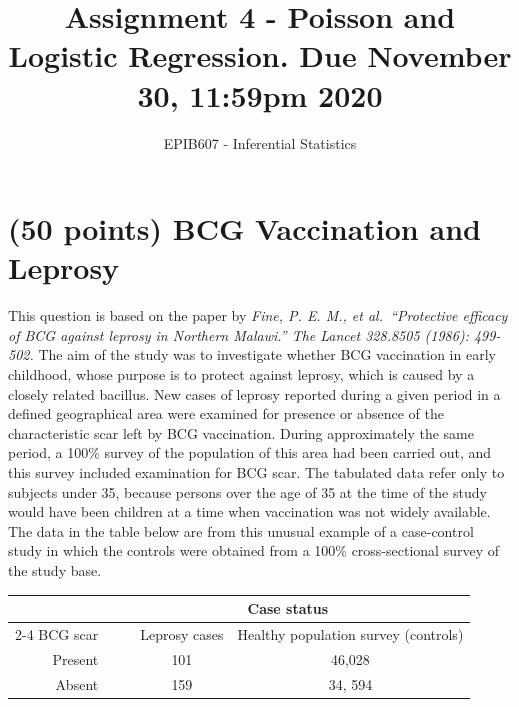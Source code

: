 \documentclass[letterpaper,12pt,twoside,]{pinp}
\title{Assignment 4 - Poisson and Logistic Regression. Due November 30, 11:59pm
2020}
\author[a]{EPIB607 - Inferential Statistics}
\affil[a]{Fall 2020, McGill University}
\begin{document}
\verticaladjustment{-2pt}

\maketitle
\thispagestyle{firststyle}



\hypertarget{points-bcg-vaccination-and-leprosy}{%
\section{(50 points) BCG Vaccination and
Leprosy}\label{points-bcg-vaccination-and-leprosy}}

This question is based on the paper by \emph{Fine, P. E. M., et
al.~``Protective efficacy of BCG against leprosy in Northern Malawi.''
The Lancet 328.8505 (1986): 499-502.} The aim of the study was to
investigate whether BCG vaccination in early childhood, whose purpose is
to protect against leprosy, which is caused by a closely related
bacillus. New cases of leprosy reported during a given period in a
defined geographical area were examined for presence or absence of the
characteristic scar left by BCG vaccination. During approximately the
same period, a 100\% survey of the population of this area had been
carried out, and this survey included examination for BCG scar. The
tabulated data refer only to subjects under 35, because persons over the
age of 35 at the time of the study would have been children at a time
when vaccination was not widely available. The data in the table below
are from this unusual example of a case-control study in which the
controls were obtained from a 100\% cross-sectional survey of the study
base.

\begin{table}[h]
    \centering
    \begin{tabular}{rrcc}
        & \multicolumn{3}{c}{Case status} \\
        \cline{2-4}
        BCG scar & \ \hspace{3mm}\ & Leprosy cases & Healthy population survey (controls) \\
        \hline
        Present && 101 & 46,028 \\
        Absent && 159 & 34, 594 \\
        \hline
    \end{tabular}
\end{table}
\end{document}
